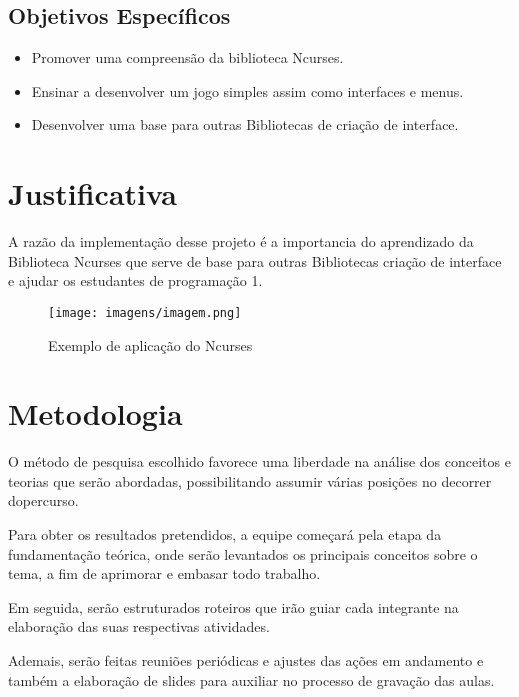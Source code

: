 \documentclass[a4paper,10pt]{article} %
\begin{document}
\subsection{Objetivos Específicos}


\begin{itemize}
 \item Promover uma compreensão da biblioteca Ncurses.
 \item Ensinar a desenvolver um jogo simples assim como interfaces e menus.
 \item Desenvolver uma base para outras Bibliotecas de criação de interface.   
\end{itemize}


\section{Justificativa}
A razão da implementação desse projeto é a importancia do aprendizado da Biblioteca Ncurses que serve de base para outras Bibliotecas criação de interface e ajudar os estudantes de programação 1.

\begin{figure}[ht] %
\centering
\texttt{[image: imagens/imagem.png]}
\caption{Exemplo de aplicação do Ncurses}
\label{fig:xsort}
\end{figure}


\section{Metodologia}
 
O método de pesquisa escolhido favorece uma liberdade na análise dos conceitos e teorias que serão abordadas, possibilitando assumir várias posições no decorrer dopercurso. 
 
Para obter os resultados pretendidos, a equipe começará pela etapa da fundamentação teórica, onde serão levantados os principais conceitos sobre o tema, a fim de aprimorar e embasar todo trabalho.
 
Em seguida, serão estruturados roteiros  que irão guiar cada integrante na elaboração das suas respectivas atividades.
 
Ademais,  serão feitas reuniões periódicas e ajustes das ações em andamento e também  a elaboração de slides para auxiliar no processo de gravação das aulas.
 
\end{document}
